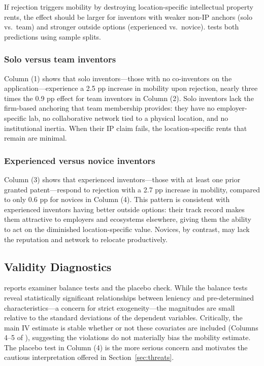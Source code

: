 \documentclass[12pt]{article}
\begin{document}
If rejection triggers mobility by destroying location-specific intellectual property rents, the effect should be larger for inventors with weaker non-IP anchors (solo vs.\ team) and stronger outside options (experienced vs.\ novice).  tests both predictions using sample splits.

\subsubsection*{Solo versus team inventors} Column (1) shows that solo inventors---those with no co-inventors on the application---experience a 2.5 pp increase in mobility upon rejection, nearly three times the 0.9 pp effect for team inventors in Column (2). Solo inventors lack the firm-based anchoring that team membership provides: they have no employer-specific lab, no collaborative network tied to a physical location, and no institutional inertia. When their IP claim fails, the location-specific rents that remain are minimal.

\subsubsection*{Experienced versus novice inventors} Column (3) shows that experienced inventors---those with at least one prior granted patent---respond to rejection with a 2.7 pp increase in mobility, compared to only 0.6 pp for novices in Column (4). This pattern is consistent with experienced inventors having better outside options: their track record makes them attractive to employers and ecosystems elsewhere, giving them the ability to act on the diminished location-specific value. Novices, by contrast, may lack the reputation and network to relocate productively.



\subsection{Validity Diagnostics}

 reports examiner balance tests and the placebo check. While the balance tests reveal statistically significant relationships between leniency and pre-determined characteristics---a concern for strict exogeneity---the magnitudes are small relative to the standard deviations of the dependent variables. Critically, the main IV estimate is stable whether or not these covariates are included (Columns 4--5 of ), suggesting the violations do not materially bias the mobility estimate. The placebo test in Column (4) is the more serious concern and motivates the cautious interpretation offered in Section~\ref{sec:threats}.
\end{document}
